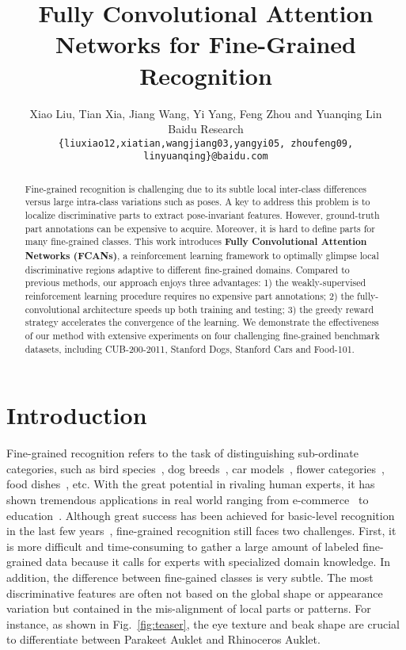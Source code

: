 \documentclass[10pt,twocolumn,letterpaper]{article}
\begin{document}
\title{Fully Convolutional Attention Networks for Fine-Grained Recognition}

\author{Xiao Liu, Tian Xia, Jiang Wang, Yi Yang, Feng Zhou and Yuanqing Lin\\
Baidu Research\\
{\tt\small \{liuxiao12,xiatian,wangjiang03,yangyi05, zhoufeng09, linyuanqing\}@baidu.com}
}

\maketitle


\begin{abstract}
Fine-grained recognition is challenging due to its subtle local inter-class differences versus large intra-class variations such as poses.
A key to address this problem is to localize discriminative parts to extract pose-invariant features.
However, ground-truth part annotations can be expensive to acquire.
Moreover, it is hard to define parts for many fine-grained classes.
This work introduces \textbf{Fully Convolutional Attention Networks (FCANs)}, a reinforcement learning framework to optimally glimpse local discriminative regions adaptive to different fine-grained domains.
Compared to previous methods, our approach enjoys three advantages:
1) the weakly-supervised reinforcement learning procedure requires no expensive part annotations;
2) the fully-convolutional architecture speeds up both training and testing;
3) the greedy reward strategy accelerates the convergence of the learning.
We demonstrate the effectiveness of our method with extensive experiments on four challenging fine-grained benchmark datasets, including CUB-200-2011, Stanford Dogs, Stanford Cars and Food-101.
\end{abstract}

\section{Introduction}
Fine-grained recognition refers to the task of distinguishing sub-ordinate categories, such as bird species~\cite{wah2011caltech}, dog breeds~\cite{khosla2011novel}, car models~\cite{krause20133d}, flower categories~\cite{nilsback2008automated}, food dishes~\cite{bossard2014food}, etc.
With the great potential in rivaling human experts, it has shown tremendous applications in real world ranging from e-commerce~\cite{bell2015learning, hadi2015buy} to education~\cite{kumar2012leafsnap, berg2014birdsnap}.
Although great success has been achieved for basic-level recognition in the last few years~\cite{krizhevsky2012imagenet, simonyan2014very, szegedy2015going, he2016deep}, fine-grained recognition still faces two challenges.
First, it is more difficult and time-consuming to gather a large amount of labeled fine-grained data because it calls for experts with specialized domain knowledge.
In addition, the difference between fine-gained classes is very subtle.
The most discriminative features are often not based on the global shape or appearance variation but contained in the mis-alignment of local parts or patterns.
For instance, as shown in Fig.~\ref{fig:teaser}, the eye texture and beak shape are crucial to differentiate between Parakeet Auklet and Rhinoceros Auklet.
\end{document}
